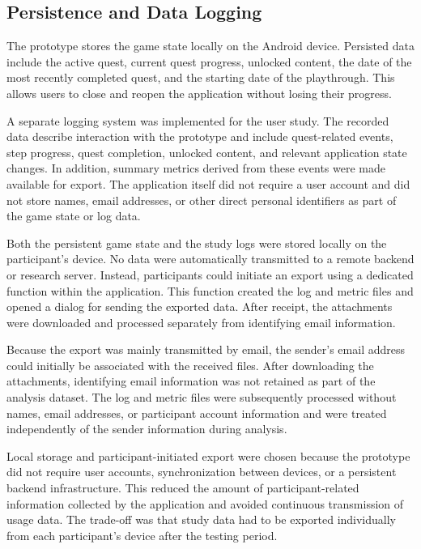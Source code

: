 \subsection{Persistence and Data Logging}

The prototype stores the game state locally on the Android device. Persisted data include the active quest, current quest progress, unlocked content, the date of the most recently completed quest, and the starting date of the playthrough. This allows users to close and reopen the application without losing their progress.

A separate logging system was implemented for the user study. The recorded data describe interaction with the prototype and include quest-related events, step progress, quest completion, unlocked content, and relevant application state changes. In addition, summary metrics derived from these events were made available for export. The application itself did not require a user account and did not store names, email addresses, or other direct personal identifiers as part of the game state or log data.

Both the persistent game state and the study logs were stored locally on the participant's device. No data were automatically transmitted to a remote backend or research server. Instead, participants could initiate an export using a dedicated function within the application. This function created the log and metric files and opened a dialog for sending the exported data. After receipt, the attachments were downloaded and processed separately from identifying email information.

Because the export was mainly transmitted by email, the sender's email address could initially be associated with the received files. After downloading the attachments, identifying email information was not retained as part of the analysis dataset. The log and metric files were subsequently processed without names, email addresses, or participant account information and were treated independently of the sender information during analysis.

Local storage and participant-initiated export were chosen because the prototype did not require user accounts, synchronization between devices, or a persistent backend infrastructure. This reduced the amount of participant-related information collected by the application and avoided continuous transmission of usage data. The trade-off was that study data had to be exported individually from each participant's device after the testing period.
